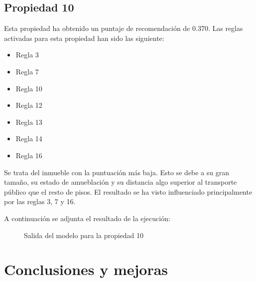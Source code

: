 \documentclass[12pt]{report} %
\begin{document}
    \section{Propiedad 10}
    Esta propiedad ha obtenido un puntaje de recomendación de $0.370$. Las
    reglas activadas para esta propiedad han sido las siguiente:
    \begin{itemize}
        \item Regla 3
        \item Regla 7
        \item Regla 10
        \item Regla 12
        \item Regla 13
        \item Regla 14
        \item Regla 16
    \end{itemize}

    Se trata del inmueble con la puntuación más baja. Esto se debe a su gran
    tamaño, su estado de amueblación y su distancia algo superior al transporte
    público que el resto de pisos. El resultado se ha visto influenciado
    principalmente por las reglas 3, 7 y 16.

    A continuación se adjunta el resultado de la ejecución:
    \begin{figure}[H]
        \centering
        \caption{Salida del modelo para la propiedad 10}
    \end{figure}

    \chapter{Conclusiones y mejoras}
    \label{chap:conclusion}

\end{document}
